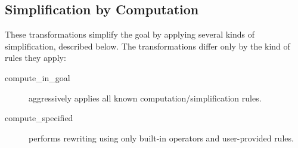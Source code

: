 \subsection{Simplification by Computation}

These transformations simplify the goal by applying several kinds of
simplification, described below. The transformations differ only by
the kind of rules they apply:
\begin{description}
\item[compute\_in\_goal] aggressively applies all known
  computation/simplification rules.

\item[compute\_specified] performs rewriting using only built-in
  operators and user-provided rules.
\end{description}

